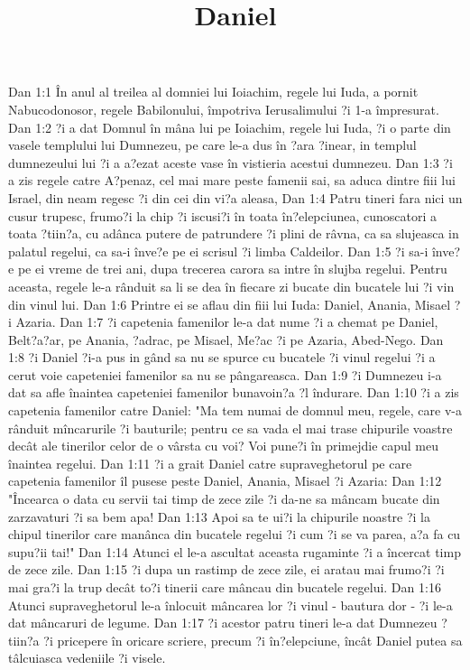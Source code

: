 

\title{Daniel}

Dan 1:1  În anul al treilea al domniei lui Ioiachim, regele lui Iuda, a pornit Nabucodonosor, regele Babilonului, împotriva Ierusalimului ?i 1-a împresurat.
Dan 1:2  ?i a dat Domnul în mâna lui pe Ioiachim, regele lui Iuda, ?i o parte din vasele templului lui Dumnezeu, pe care le-a dus în ?ara ?inear, in templul dumnezeului lui ?i a a?ezat aceste vase în vistieria acestui dumnezeu.
Dan 1:3  ?i a zis regele catre A?penaz, cel mai mare peste famenii sai, sa aduca dintre fiii lui Israel, din neam regesc ?i din cei din vi?a aleasa,
Dan 1:4  Patru tineri fara nici un cusur trupesc, frumo?i la chip ?i iscusi?i în toata în?elepciunea, cunoscatori a toata ?tiin?a, cu adânca putere de patrundere ?i plini de râvna, ca sa slujeasca in palatul regelui, ca sa-i înve?e pe ei scrisul ?i limba Caldeilor.
Dan 1:5  ?i sa-i înve?e pe ei vreme de trei ani, dupa trecerea carora sa intre în slujba regelui. Pentru aceasta, regele le-a rânduit sa li se dea în fiecare zi bucate din bucatele lui ?i vin din vinul lui.
Dan 1:6  Printre ei se aflau din fiii lui Iuda: Daniel, Anania, Misael ?i Azaria.
Dan 1:7  ?i capetenia famenilor le-a dat nume ?i a chemat pe Daniel, Belt?a?ar, pe Anania, ?adrac, pe Misael, Me?ac ?i pe Azaria, Abed-Nego.
Dan 1:8  ?i Daniel ?i-a pus in gând sa nu se spurce cu bucatele ?i vinul regelui ?i a cerut voie capeteniei famenilor sa nu se pângareasca.
Dan 1:9  ?i Dumnezeu i-a dat sa afle înaintea capeteniei famenilor bunavoin?a ?l îndurare.
Dan 1:10  ?i a zis capetenia famenilor catre Daniel: "Ma tem numai de domnul meu, regele, care v-a rânduit mîncarurile ?i bauturile; pentru ce sa vada el mai trase chipurile voastre decât ale tinerilor celor de o vârsta cu voi? Voi pune?i în primejdie capul meu înaintea regelui.
Dan 1:11  ?i a grait Daniel catre supraveghetorul pe care capetenia famenilor îl pusese peste Daniel, Anania, Misael ?i Azaria:
Dan 1:12  "Încearca o data cu servii tai timp de zece zile ?i da-ne sa mâncam bucate din zarzavaturi ?i sa bem apa!
Dan 1:13  Apoi sa te ui?i la chipurile noastre ?i la chipul tinerilor care manânca din bucatele regelui ?i cum ?i se va parea, a?a fa cu supu?ii tai!"
Dan 1:14  Atunci el le-a ascultat aceasta rugaminte ?i a încercat timp de zece zile.
Dan 1:15  ?i dupa un rastimp de zece zile, ei aratau mai frumo?i ?i mai gra?i la trup decât to?i tinerii care mâncau din bucatele regelui.
Dan 1:16  Atunci supraveghetorul le-a înlocuit mâncarea lor ?i vinul - bautura dor - ?i le-a dat mâncaruri de legume.
Dan 1:17  ?i acestor patru tineri le-a dat Dumnezeu ?tiin?a ?i pricepere în oricare scriere, precum ?i în?elepciune, încât Daniel putea sa tâlcuiasca vedeniile ?i visele.
